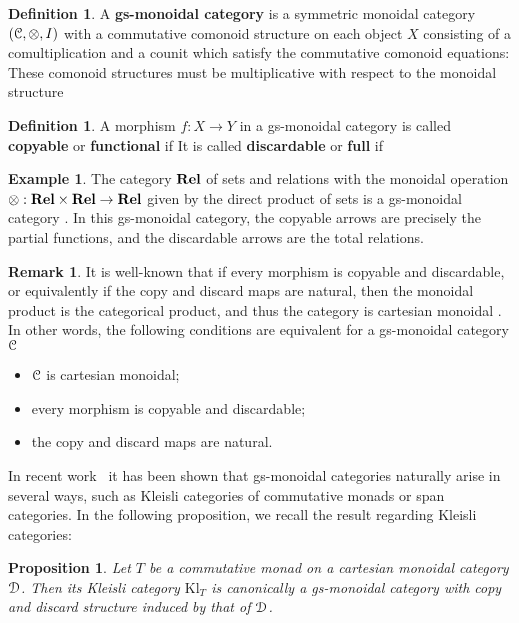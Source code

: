 \documentclass[a4paper,UKenglish,numberwithinsect,cleveref, autoref, thm-restate]{lipics-v2021}
\theoremstyle{plain} %
\newtheorem{myproposition}[mytheorem]{Proposition}
\theoremstyle{definition} %
\newtheorem{mydefinition}[mytheorem]{Definition}
\newtheorem{myremark}[mytheorem]{Remark}
\newtheorem{myexample}[mytheorem]{Example}
\begin{document}
\begin{mydefinition}
A \textbf{gs-monoidal category} is a symmetric monoidal category $(\mathcal{C}, \otimes, I)$
with a commutative comonoid structure on each object $X$ consisting of a comultiplication
and a counit
which satisfy the commutative comonoid equations:
These comonoid structures must be multiplicative with respect to the monoidal structure
\end{mydefinition}


\begin{mydefinition}
 A morphism $f:X\to Y$ in a gs-monoidal category is called \textbf{copyable} or \textbf{functional} if
 It is called \textbf{discardable} or \textbf{full} if 
\end{mydefinition}

\begin{myexample}
The category $\mathbf{Rel}$ of sets and relations with the monoidal operation $\otimes : \mathbf{Rel} \times \mathbf{Rel}\to \mathbf{Rel}$ given by the direct product of sets is a gs-monoidal category \cite{CorradiniGadducci02}. In this gs-monoidal category, the copyable arrows are precisely the partial functions, and the discardable arrows are the total relations.
\end{myexample}

\begin{myremark}\label{cartesiancase}
It is well-known that if every morphism is copyable and discardable, or equivalently if the copy and discard maps are natural, then the monoidal product is the categorical product, and thus the category is cartesian monoidal \cite{Fox:CACC}.
In other words, the following conditions are equivalent for a gs-monoidal category $\mathcal{C}$
 \begin{itemize}
  \item $\mathcal{C}$ is cartesian monoidal;
  \item every morphism is copyable and discardable;
  \item the copy and discard maps are natural.
 \end{itemize}
\end{myremark}
%
In recent work~\cite{fgtc2022lax} it has been shown that gs-monoidal categories naturally arise in several ways, such as Kleisli categories of commutative monads or span categories. In the following proposition, we recall the result regarding Kleisli categories:

\begin{myproposition}\label{monoidalgs}
 Let $T$ be a commutative monad on a cartesian monoidal category $\mathcal{D}$. 
 Then its Kleisli category $\mathrm{Kl}_T$ is canonically a gs-monoidal category with copy and discard structure induced by that of $\mathcal{D}$.
\end{myproposition}
\end{document}
